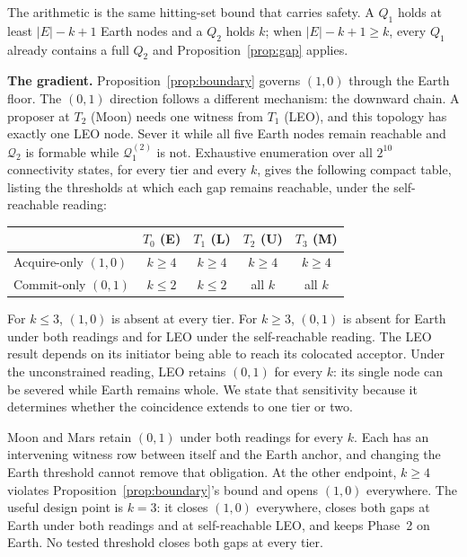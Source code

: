 \documentclass[letterpaper,twocolumn,10pt]{article}
\newcounter{prop}
\begin{document}
The arithmetic is the same hitting-set bound that carries safety. A $Q_1$ holds at least $|E|-k+1$ Earth nodes and a $Q_2$ holds $k$; when $|E|-k+1 \ge k$, every $Q_1$ already contains a full $Q_2$ and Proposition~\ref{prop:gap} applies.

\textbf{The gradient.} Proposition~\ref{prop:boundary} governs $(1,0)$ through the Earth floor. The $(0,1)$ direction follows a different mechanism: the downward chain. A proposer at $T_2$ (Moon) needs one witness from $T_1$ (LEO), and this topology has exactly one LEO node. Sever it while all five Earth nodes remain reachable and $\mathcal{Q}_2$ is formable while $\mathcal{Q}_1^{(2)}$ is not. Exhaustive enumeration over all $2^{10}$ connectivity states, for every tier and every $k$, gives the following compact table, listing the thresholds at which each gap remains reachable, under the self-reachable reading:

\begin{center}
\begin{tabular}{@{}lcccc@{}}
\toprule
 & $T_0$ (E) & $T_1$ (L) & $T_2$ (U) & $T_3$ (M) \\
\midrule
Acquire-only $(1,0)$ & $k \ge 4$ & $k \ge 4$ & $k \ge 4$ & $k \ge 4$ \\
Commit-only $(0,1)$ & $k \le 2$ & $k \le 2$ & all $k$ & all $k$ \\
\bottomrule
\end{tabular}
\end{center}

For $k \le 3$, $(1,0)$ is absent at every tier. For $k \ge 3$, $(0,1)$ is absent for Earth under both readings and for LEO under the self-reachable reading. The LEO result depends on its initiator being able to reach its colocated acceptor. Under the unconstrained reading, LEO retains $(0,1)$ for every $k$: its single node can be severed while Earth remains whole. We state that sensitivity because it determines whether the coincidence extends to one tier or two.

Moon and Mars retain $(0,1)$ under both readings for every $k$. Each has an intervening witness row between itself and the Earth anchor, and changing the Earth threshold cannot remove that obligation. At the other endpoint, $k \ge 4$ violates Proposition~\ref{prop:boundary}'s bound and opens $(1,0)$ everywhere. The useful design point is $k=3$: it closes $(1,0)$ everywhere, closes both gaps at Earth under both readings and at self-reachable LEO, and keeps Phase~2 on Earth. No tested threshold closes both gaps at every tier.
\end{document}
